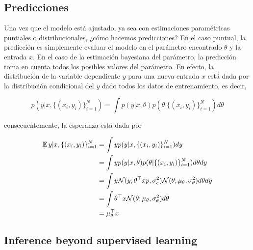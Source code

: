 \subsection{Predicciones} %
\label{sub:predicciones}
Una vez que el modelo está ajustado, ya sea con estimaciones paramétricas puntiales o distribucionales, ¿cómo hacemos predicciones? En el caso puntual, la predicción es simplemente evaluar el modelo en el parámetro encontrado $\theta$ y la entrada $x$. En el caso de la estimación bayesiana del parámetro, la predicción toma en cuenta todos los posibles valores del parámetro. En efecto, la distribución de la variable dependiente $y$ para una nueva entrada $x$ está dada por la distribución condicional del $y$ dado todos los datos de entrenamiento, es decir, 

\begin{equation}
 	p(y|x,\{(x_i,y_i)\}_{i=1}^N) = \int p(y|x, \theta)p(\theta|\{(x_i,y_i)\}_{i=1}^N) d\theta
 \end{equation} 

consecuentemente, la esperanza está dada por

\begin{align}
	\operatorname{\mathbb{E}}{y|x,\{(x_i,y_i)\}_{i=1}^N} 
	&= \int y p(y|x,\{(x_i,y_i)\}_{i=1}^N) dy\\
	&= \int y p(y|x, \theta)p(\theta|\{(x_i,y_i)\}_{i=1}^N) d\theta dy\\
	&= \int y {\mathcal N}(y;\theta^\top xp,\sigma_e^2){\mathcal N}(\theta;\mu_\theta, \sigma_\theta^2) d\theta dy\\
	&= \int \theta^\top x{\mathcal N}(\theta;\mu_\theta, \sigma_\theta^2) d\theta \\
	&= \mu_\theta^\top x
\end{align}


\subsection{Inference beyond supervised learning} %
\label{sub:inference_beyond_supervised_learning}

